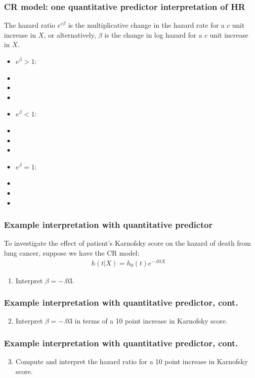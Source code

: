 \begin{frame}
\frametitle{CR model: one quantitative predictor interpretation of HR}
The hazard ratio $e^{c\beta}$ is the multiplicative change in the hazard rate for a $c$ unit increase in $X$, or alternatively, $\beta$ is the change in log hazard for a $c$ unit increase in $X$.
\begin{itemize}
\item $e^{\beta}>1$:
\item[]
\item[]
\item[]
\item $e^{\beta}<1$:
\item[]
\item[]
\item[]
\item $e^{\beta}=1$:
\item[]
\item[]
\item[]
\end{itemize}
\end{frame}

\begin{frame}
\frametitle{Example interpretation with quantitative predictor}
To investigate the effect of patient's Karnofsky score on the hazard of death from lung cancer, suppose we have the CR model:
\begin{eqnarray}
h(t|X) = h_0(t)e^{-.03X} \nonumber
\end{eqnarray}
\begin{enumerate}
\item Interpret $\beta=-.03$.
\end{enumerate}
\vskip200pt
\end{frame}

\begin{frame}
\frametitle{Example interpretation with quantitative predictor, cont.}
\begin{enumerate}
\setcounter{enumi}{1}
\item Interpret $\beta=-.03$ in terms of a 10 point increase in Karnofsky score.
\end{enumerate}
\vskip200pt
\end{frame}

\begin{frame}
\frametitle{Example interpretation with quantitative predictor, cont.}
\begin{enumerate}
\setcounter{enumi}{2}
\item Compute and interpret the hazard ratio for a 10 point increase in Karnofsky score.
\end{enumerate}
\vskip200pt
\end{frame}


